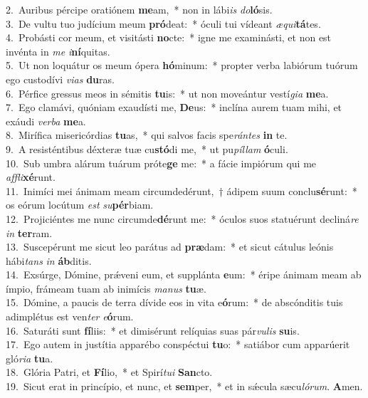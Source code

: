 {2.~}Auribus pércipe oratiónem \textbf{me}am,~* non in lábi\textit{is} \textit{do}\textbf{ló}sis.\\
{3.~}De vultu tuo judícium meum \textbf{pró}deat:~* óculi tui vídeant \textit{æ}\textit{qui}\textbf{tá}tes.\\
{4.~}Probásti cor meum, et visitásti \textbf{no}cte:~* igne me examinásti, et non est invénta in \textit{me} \textit{i}\textbf{ní}quitas.\\
{5.~}Ut non loquátur os meum ópera \textbf{hó}minum:~* propter verba labiórum tuórum ego custodívi \textit{vi}\textit{as} \textbf{du}ras.\\
{6.~}Pérfice gressus meos in sémitis \textbf{tu}is:~* ut non moveántur vestí\textit{gi}\textit{a} \textbf{me}a.\\
{7.~}Ego clamávi, quóniam exaudísti me, \textbf{De}us:~* inclína aurem tuam mihi, et exáudi \textit{ver}\textit{ba} \textbf{me}a.\\
{8.~}Mirífica misericórdias \textbf{tu}as,~* qui salvos facis spe\textit{rán}\textit{tes} \textbf{in} te.\\
{9.~}A resisténtibus déxteræ tuæ cu\textbf{stó}di me,~* ut pu\textit{píl}\textit{lam} \textbf{ó}culi.\\
{10.~}Sub umbra alárum tuárum próte\textbf{ge} me:~* a fácie impiórum qui me \textit{af}\textit{fli}\textbf{xé}runt.\\
{11.~}Inimíci mei ánimam meam circumdedérunt,~† ádipem suum conclu\textbf{sé}runt:~* os eórum locútum \textit{est} \textit{su}\textbf{pér}biam.\\
{12.~}Projiciéntes me nunc circumde\textbf{dé}runt me:~* óculos suos statuérunt decliná\textit{re} \textit{in} \textbf{ter}ram.\\
{13.~}Suscepérunt me sicut leo parátus ad \textbf{præ}dam:~* et sicut cátulus leónis hábi\textit{tans} \textit{in} \textbf{áb}ditis.\\
{14.~}Exsúrge, Dómine, prǽveni eum, et supplánta \textbf{e}um:~* éripe ánimam meam ab ímpio, frámeam tuam ab inimícis \textit{ma}\textit{nus} \textbf{tu}æ.\\
{15.~}Dómine, a paucis de terra dívide eos in vita e\textbf{ó}rum:~* de abscónditis tuis adimplétus est ven\textit{ter} \textit{e}\textbf{ó}rum.\\
{16.~}Saturáti sunt \textbf{fí}liis:~* et dimisérunt relíquias suas pár\textit{vu}\textit{lis} \textbf{su}is.\\
{17.~}Ego autem in justítia apparébo conspéctui \textbf{tu}o:~* satiábor cum apparúerit gló\textit{ri}\textit{a} \textbf{tu}a.\\
{18.~}Glória Patri, et \textbf{Fí}lio,~* et Spirí\textit{tu}\textit{i} \textbf{San}cto.\\
{19.~}Sicut erat in princípio, et nunc, et \textbf{sem}per,~* et in sǽcula sæcu\textit{ló}\textit{rum}. \textbf{A}men.\\
